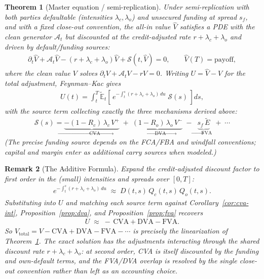 \documentclass{report}
\theoremstyle{spacedplain}
\newtheorem{theorem}{Theorem}[section]
\theoremstyle{spaceddefinition}
\theoremstyle{spacedremark}
\newtheorem{remark}[theorem]{Remark}
\begin{document}
\begin{theorem}[Master equation / semi-replication]\label{thm:master}
Under semi-replication with both parties defaultable (intensities $\lambda_c,\lambda_o$) and unsecured funding at spread $s_f$, and with a fixed close-out convention, the all-in value $\widehat V$ satisfies a PDE with the clean generator $\mathcal{A}_t$ but discounted at the \emph{credit-adjusted} rate $r+\lambda_c+\lambda_o$ and driven by default/funding sources:
\begin{align}
    \partial_t \widehat V + \mathcal{A}_t \widehat V - (r+\lambda_c+\lambda_o)\widehat V + \mathcal{S}(t,\widehat V) = 0,
    \qquad \widehat V(T)=\text{payoff},
\end{align}
where the clean value $V$ solves $\partial_t V + \mathcal{A}_t V - r V = 0$. Writing $U=\widehat V - V$ for the total adjustment, Feynman--Kac gives
\begin{align}
    U(t) = \int_t^T \widetilde{\mathbb{E}}_t\!\left[\,e^{-\int_t^s (r+\lambda_c+\lambda_o)\,du}\;\mathcal{S}(s)\,\right]ds,
\end{align}
with the source term collecting exactly the three mechanisms derived above:
\begin{align}
    \mathcal{S}(s) = \underbrace{-(1-R_c)\,\lambda_c\,V^+}_{\to\ \text{CVA}}
    \;+\;\underbrace{(1-R_o)\,\lambda_o\,V^-}_{\to\ \text{DVA}}
    \;-\;\underbrace{s_f\,\widetilde{E}}_{\to\ \text{FVA}} \;+\;\cdots
\end{align}
(The precise funding source depends on the FCA/FBA and windfall conventions; capital and margin enter as additional carry sources when modeled.)
\end{theorem}

\begin{remark}[The Additive Formula]
Expand the credit-adjusted discount factor to first order in the (small) intensities and spreads over $[0,T]$:
\begin{align}
    e^{-\int_t^s (r+\lambda_c+\lambda_o)\,du} \;\approx\; D(t,s)\,Q_c(t,s)\,Q_o(t,s).
\end{align}
Substituting into $U$ and matching each source term against Corollary~\ref{cor:cva-int}, Proposition~\ref{prop:dva}, and Proposition~\ref{prop:fva} recovers
\begin{align}
    U \;\approx\; -\,\text{CVA} + \text{DVA} - \text{FVA}.
\end{align}
So $V_{\text{total}} = V - \text{CVA} + \text{DVA} - \text{FVA} - \cdots$ is precisely the linearization of Theorem~\ref{thm:master}. The exact solution has the adjustments interacting through the shared discount rate $r+\lambda_c+\lambda_o$: at second order, CVA is itself discounted by the funding and own-default terms, and the FVA/DVA overlap is resolved by the single close-out convention rather than left as an accounting choice.
\end{remark}
\end{document}
